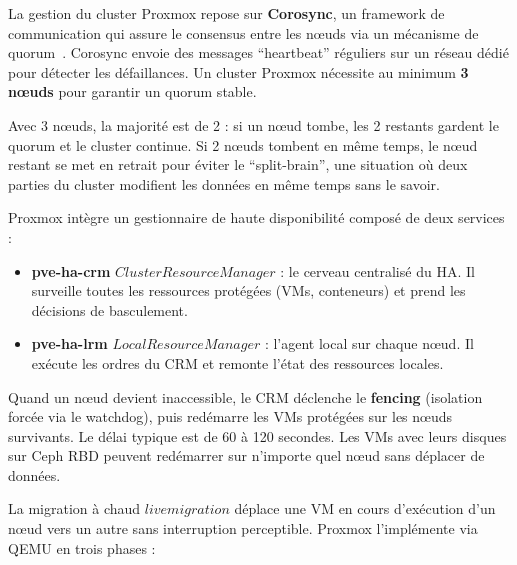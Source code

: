 
\par La gestion du cluster Proxmox repose sur \textbf{Corosync}, un framework de communication qui assure le consensus entre les n\oe{}uds via un mécanisme de quorum~\cite{ref20}. Corosync envoie des messages ``heartbeat'' réguliers sur un réseau dédié pour détecter les défaillances. Un cluster Proxmox nécessite au minimum \textbf{3 n\oe{}uds} pour garantir un quorum stable.\\

\par Avec 3 n\oe{}uds, la majorité est de 2 : si un n\oe{}ud tombe, les 2 restants gardent le quorum et le cluster continue. Si 2 n\oe{}uds tombent en même temps, le n\oe{}ud restant se met en retrait pour éviter le ``split-brain'', une situation où deux parties du cluster modifient les données en même temps sans le savoir.\\


\par Proxmox intègre un gestionnaire de haute disponibilité composé de deux services~\cite{refHA} :\\

\begin{itemize}

    \item \textbf{pve-ha-crm} \(Cluster Resource Manager\) : le cerveau centralisé du HA. Il surveille toutes les ressources protégées (VMs, conteneurs) et prend les décisions de basculement.

    \item \textbf{pve-ha-lrm} \(Local Resource Manager\) : l'agent local sur chaque n\oe{}ud. Il exécute les ordres du CRM et remonte l'état des ressources locales.

\end{itemize}

\par Quand un n\oe{}ud devient inaccessible, le CRM déclenche le \textbf{fencing} (isolation forcée via le watchdog), puis redémarre les VMs protégées sur les n\oe{}uds survivants. Le délai typique est de 60 à 120 secondes. Les VMs avec leurs disques sur Ceph RBD peuvent redémarrer sur n'importe quel n\oe{}ud sans déplacer de données.\\


\par La migration à chaud \(live migration\) déplace une VM en cours d'exécution d'un n\oe{}ud vers un autre sans interruption perceptible. Proxmox l'implémente via QEMU en trois phases :\\

